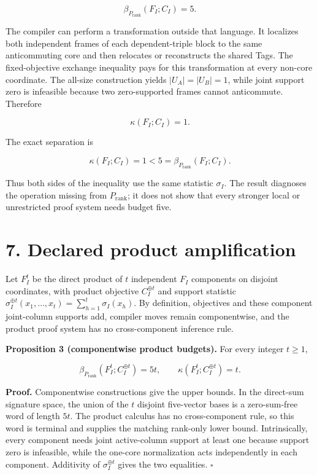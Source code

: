 \documentclass[11pt]{article}
\begin{document}
\[
\beta_{P_{\mathrm{rank}}}(F_I;C_I)=5.
\]

The compiler can perform a transformation outside that language. It localizes both independent frames of each dependent-triple block to the same anticommuting core and then relocates or reconstructs the shared Tags. The fixed-objective exchange inequality pays for this transformation at every non-core coordinate. The all-size construction yields \(|U_A|=|U_B|=1\), while joint support zero is infeasible because two zero-supported frames cannot anticommute. Therefore

\[
\kappa(F_I;C_I)=1.
\]

The exact separation is

\[
\kappa(F_I;C_I)=1
<5
=\beta_{P_{\mathrm{rank}}}(F_I;C_I).
\]

Thus both sides of the inequality use the same statistic \(\sigma_I\). The result diagnoses the operation missing from \(P_{\mathrm{rank}}\); it does not show that every stronger local or unrestricted proof system needs budget five.

\hypertarget{declared-product-amplification}{%
\section*{7. Declared product amplification}\label{declared-product-amplification}}

Let \(F_I^t\) be the direct product of \(t\) independent \(F_I\) components on disjoint coordinates, with product objective \(C_I^{\oplus t}\) and support statistic \(\sigma_I^{\oplus t}(x_1,\ldots,x_t)=\sum_{h=1}^t\sigma_I(x_h)\). By definition, objectives and these component joint-column supports add, compiler moves remain componentwise, and the product proof system has no cross-component inference rule.

\textbf{Proposition 3 (componentwise product budgets).} For every integer \(t\geq 1\),

\[
\beta_{P_{\mathrm{rank}}}(F_I^t;C_I^{\oplus t})=5t,
\qquad
\kappa(F_I^t;C_I^{\oplus t})=t.
\]

\textbf{Proof.} Componentwise constructions give the upper bounds. In the direct-sum signature space, the union of the \(t\) disjoint five-vector bases is a zero-sum-free word of length \(5t\). The product calculus has no cross-component rule, so this word is terminal and supplies the matching rank-only lower bound. Intrinsically, every component needs joint active-column support at least one because support zero is infeasible, while the one-core normalization acts independently in each component. Additivity of \(\sigma_I^{\oplus t}\) gives the two equalities. \(\square\)
\end{document}
